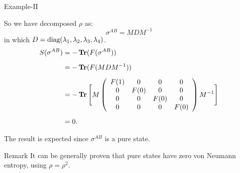 \documentclass{beamer}
\begin{document}
\begin{frame}{Example-II}
\begin{scriptsize}
So we have decomposed $\rho$ as:
\begin{equation*}
\sigma^{AB}=MDM^{-1}
\end{equation*}
in which $D=\operatorname{\textup{diag}}(\lambda_1,\lambda_2,\lambda_3,\lambda_4)$.
\begin{align}
S(\sigma^{AB}) &= -\operatorname{\textup{\textbf{Tr}}}(F(\sigma^{AB})) \nonumber \\[0.5em]
&= -\operatorname{\textup{\textbf{Tr}}} (F(MDM^{-1})) \nonumber \\[0.5em]
&=-\operatorname{\textup{\textbf{Tr}}} \Bigg[
M
\left( \begin{array}{cccc}
 F(1) & 0 & 0 & 0 \\
 0 & F(0) & 0 & 0 \\
 0 & 0 & F(0) & 0 \\
 0 & 0 & 0 & F(0) \\
\end{array}
\right)
M^{-1}
\Bigg]
\nonumber\\[0.5em]
&=0 \nonumber .
\end{align}

The result is expected since $\sigma^{AB}$ is a pure state.
\begin{alertblock}{Remark}
It can be generally proven that pure states have zero von  Neumann entropy, using $\rho=\rho^2$.
\end{alertblock}
\end{scriptsize}
\end{frame}
\end{document}
